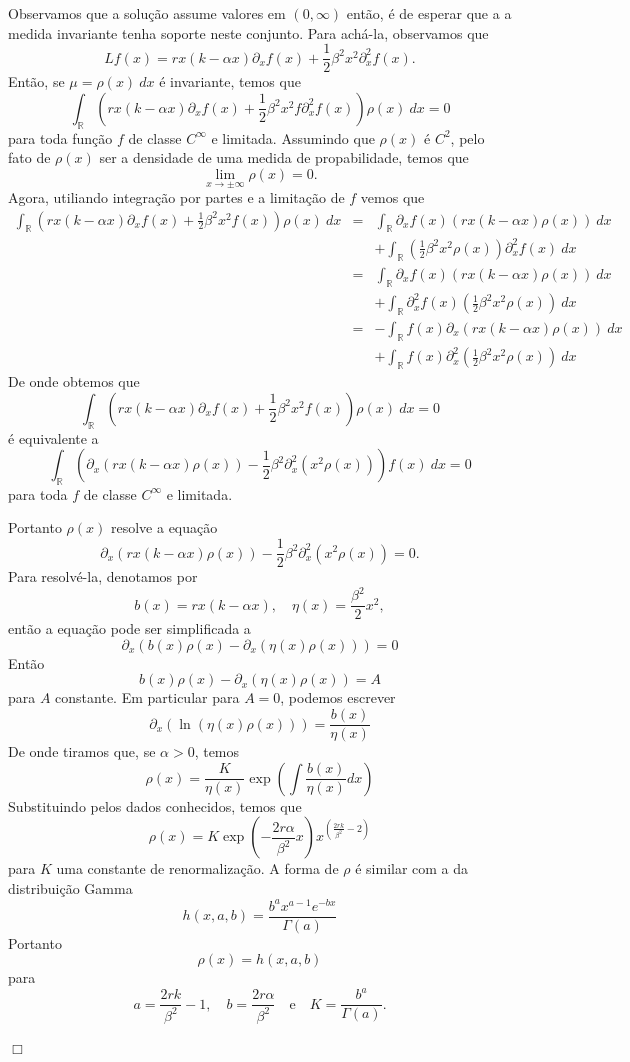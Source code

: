 \documentclass[12pt]{article}
\newenvironment{proof}{\noindent{\it Demonstra\c{c}\~ao.} }{\hfill $\Box$ \newline}
\newcommand{\mr }{ \mathbb{R}}
\begin{document}
\begin{proof}
 Observamos que a solução assume valores em $(0,\infty)$ então, é de esperar que a a medida invariante tenha soporte neste conjunto. Para achá-la, observamos que 
\[
Lf(x)=rx(k-\alpha x)\partial_xf(x)+\frac{1}{2}\beta^2 x^2\partial_x^2f(x).
\]
Então, se $\mu=\rho(x)~dx$ é invariante, temos que 
\[
\int_\mr\left(rx(k-\alpha x)\partial_xf(x)+\frac{1}{2}\beta^2 x^2f\partial_x^2f(x)\right)\rho(x)~dx=0
\]para toda função $f$ de classe $C^\infty$ e limitada. Assumindo que $\rho(x)$ é $C^2$, pelo fato de $\rho(x)$ ser a densidade de uma medida de propabilidade, temos que 
 \[
 \lim_{x\rightarrow \pm\infty}\rho(x)=0.
 \] 
 Agora, utiliando integração por partes e a limitação de $f$ vemos que 
 \begin{eqnarray*}
 \int_\mr\left(rx(k-\alpha x)\partial_xf(x)+\frac{1}{2}\beta^2 x^2f(x)\right)\rho(x)~dx&=& \int_\mr\partial_xf(x)\left(rx(k-\alpha x) \rho(x)\right)~dx\\
 &&+\int_\mr\left(\frac{1}{2}\beta^2 x^2\rho(x)\right) \partial_x^2 f(x)~dx\\
 &=&\int_\mr\partial_xf(x)\left(rx(k-\alpha x) \rho(x)\right)~dx\\
 &&+\int_\mr \partial_x^2 f(x)\left(\frac{1}{2}\beta^2 x^2\rho(x)\right)~dx\\
  &=&-\int_\mr f(x)\partial_x\left(rx(k-\alpha x) \rho(x)\right)~dx\\
 &&+\int_\mr f(x)\partial_x^2\left(\frac{1}{2}\beta^2 x^2\rho(x)\right)  ~dx
 \end{eqnarray*}
De onde obtemos que  
 \[
 \int_\mr\left(rx(k-\alpha x)\partial_xf(x)+\frac{1}{2}\beta^2 x^2f(x)\right)\rho(x)~dx=0\]
é equivalente a
 \[
\int_\mr\left(\partial_x\left(rx(k-\alpha x)\rho(x)\right)-\frac{1}{2}\beta^2 \partial_x^2(x^2\rho(x))\right)f(x)~dx=0
\]
para toda $f$ de classe $C^\infty$ e limitada.
 
 
 Portanto $\rho(x)$ resolve a equação 
\[ \partial_x\left(rx(k-\alpha x)\rho(x)\right)-\frac{1}{2}\beta^2 \partial_x^2(x^2\rho(x))=0.\]
Para resolvé-la, denotamos por 
\[
b(x)=rx(k-\alpha x),\quad \eta(x)=\frac{\beta^2}{2}x^2,
\]
então a equação pode ser simplificada a 
\[
\partial_x\left(b(x)\rho(x)-\partial_x(\eta(x)\rho(x))\right)=0
\]
Então 
\[
b(x)\rho(x)-\partial_x(\eta(x)\rho(x))=A
\]
para $A$ constante. Em particular para $A=0$, podemos escrever 
\[
\partial_x\left(\ln\left(\eta(x)\rho(x)\right)\right)=\frac{b(x)}{\eta(x)}
\]
De onde tiramos que, se $\alpha>0$, temos 
\[
\rho(x)=\frac{K}{\eta(x)}\exp\left(\int\frac{b(x)}{\eta(x)}dx\right)
\]
Substituindo pelos dados conhecidos, temos que 
\[
\rho(x)=K\exp\left(-\frac{2r\alpha}{\beta^2}x\right)
x^{\left(\frac{2rk}{\beta^2}-2\right)}
\]
para $K$ uma constante de renormalização. A forma de $\rho$ é similar com a da distribuição Gamma
\[h(x,a,b)=\frac{b^ax^{a-1}e^{-bx}}{\Gamma(a)} \] Portanto 
\[
\rho(x)=h(x,a,b)
\]
para 
\[
a=\frac{2rk}{\beta^2}-1,\quad b=\frac{2r\alpha}{\beta^2}\quad \textrm{e}\quad 
K=\frac{b^a}{\Gamma(a)}.
\]

\end{proof}
\end{document}
